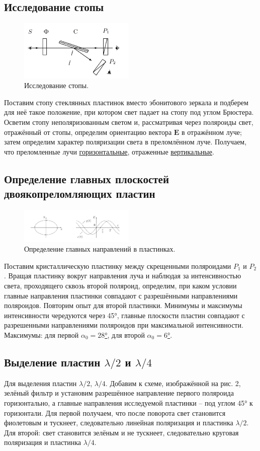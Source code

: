\documentclass[a4paper,12pt]{article} %
\begin{document}
\subsection{Исследование стопы}
\begin{figure}
	\includegraphics[width=5.5cm]{2.png}
	\caption{Исследование стопы.}
	\label{pic:2}
\end{figure}
Поставим стопу стеклянных пластинок вместо эбонитового зеркала и подберем для неё такое положение, при котором свет падает на стопу под углом Брюстера. Осветим стопу неполяризованным светом и, рассматривая через поляроиды свет, отражённый от стопы, определим ориентацию вектора $ \mathbf{E} $ в отражённом луче; затем определим характер поляризации света в преломлённом луче. Получаем, что преломленные лучи \underline{горизонтальные}, отраженные \underline{вертикальные}.

\subsection{Определение главных плоскостей двоякопреломляющих пластин}
\begin{figure}
	\includegraphics[width=5.5cm]{5.png}
	\caption{Определение главных направлений в пластинках.}
	\label{pic:3}
\end{figure}
Поставим кристаллическую пластинку между скрещенными поляроидами $ P_1 $ и $ P_2 $. Вращая пластинку вокруг направления луча и наблюдая за интенсивностью света, проходящего сквозь второй поляроид, определим, при каком условии главные направления пластинки совпадают с разрешёнными направлениями поляроидов. Повторим опыт для второй пластинки. Минимумы и максимумы интенсивности чередуются через 45°, главные плоскости пластин совпадают с разрешенными направлениями поляроидов при максимальной интенсивности. Максимумы: для первой \underline{$ \alpha_0 = 28 $°}, для второй \underline{$ \alpha_0 = 6 $°}.

\subsection{Выделение пластин $ \lambda / 2 $ и $ \lambda / 4 $}
Для выделения пластин $ \lambda / 2 $, $ \lambda / 4 $. Добавим к схеме, изображённой на рис. 2, зелёный фильтр и установим разрешённое направление первого поляроида горизонтально, а главные направления исследуемой пластинки -- под углом 45° к горизонтали. Для первой получаем, что после поворота свет становится фиолетовым и тускнеет, следовательно линейная поляризация и пластинка $ \lambda / 2 $. Для второй: свет становится зелёным и не тускнеет, следовательно круговая поляризация и пластинка $ \lambda / 4 $.
\end{document}
